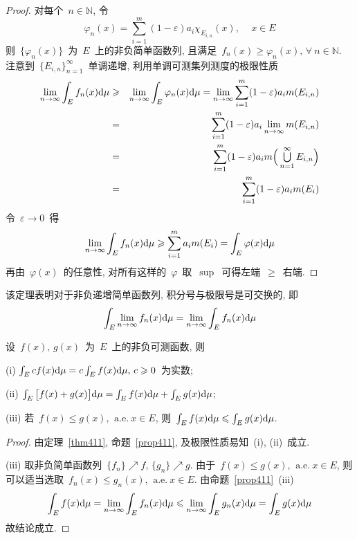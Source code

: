 \begin{proof}
对每个~$n \in \mathbb{N}$, 令
\[
\varphi_n(x) = \sum_{i=1}^m (1- \varepsilon) a_i \chi_{E_{i,n}}(x),\, \quad x \in E
\]
则~$\{\varphi_n(x)\}$~为~$E$~上的非负简单函数列, 且满足~$f_n(x) \geqslant \varphi_n(x),\,  \forall~n \in \mathbb{N}$. 注意到~$\big\{E_{i,n} \big\}_{n=1}^\infty$~单调递增, 利用单调可测集列测度的极限性质
\begin{eqnarray*}
\lim_{n \to \infty} \int_E f_n(x) \mathrm{d} \mu &\geqslant& \lim_{n \to \infty} \int_E \varphi_n(x) \mathrm{d} \mu = \lim_{n \to \infty} \sum_{i=1}^m (1- \varepsilon) a_i m(E_{i,n}) \\
&=& \sum_{i=1}^m (1- \varepsilon) a_i \lim_{n \to \infty} m(E_{i,n}) \\
&=& \sum_{i=1}^m (1- \varepsilon) a_i m\Big( \mathop{\textstyle{\bigcup}}_{n=1}^\infty E_{i,n} \Big) \\
&=& \sum_{i=1}^m (1- \varepsilon) a_i m(E_i)
\end{eqnarray*}
令~$\varepsilon \to 0$~得
\[
\lim\limits_{n \to \infty} \int_E f_n(x) \mathrm{d} \mu \geqslant \sum_{i=1}^m a_i m(E_i) = \int_E \varphi(x) \mathrm{d} \mu
\]
再由~$\varphi(x)$~的任意性, 对所有这样的~$\varphi$~取~$\sup$~可得左端~$\geqslant$~右端.
\end{proof}

\begin{remark} \label{rem411}
该定理表明对于非负递增简单函数列, 积分号与极限号是可交换的, 即
\[
\int_E \lim_{n \to \infty} f_n(x) \mathrm{d} \mu = \lim_{n \to \infty} \int_E f_n(x) \mathrm{d} \mu
\]
\end{remark}

\begin{proposition} \label{prop412}
设~$f(x),\, g(x)$~为~$E$~上的非负可测函数, 则

(i) $\int_E c f(x) \mathrm{d} \mu = c \int_E f(x) \mathrm{d} \mu, \, c \geqslant 0$~为实数;

(ii) $\int_E \big[f(x) + g(x)\big] \mathrm{d} \mu = \int_E f(x) \mathrm{d} \mu + \int_E g(x) \mathrm{d} \mu$;

(iii) 若~$f(x) \leqslant g(x),\,  \mathrm{~a.e.~} x \in E$, 则~$\int_E f(x) \mathrm{d} \mu \leqslant \int_E g(x) \mathrm{d} \mu$.
\end{proposition}

\begin{proof}
由定理~\ref{thm411}, 命题~\ref{prop411}, 及极限性质易知~(i), (ii)~成立.

(iii) 取非负简单函数列~$\{f_n\} \nearrow f,\,  \{g_n\} \nearrow g$. 由于~$f(x) \leqslant g(x),\,  \mathrm{~a.e.~} x \in E$, 则可以适当选取~$f_n(x) \leqslant g_n(x),\,   \mathrm{~a.e.~} x \in E$. 由命题~\ref{prop411}~(iii)
\[
\int_E f(x) \mathrm{d} \mu = \lim_{n \to \infty} \int_E f_n(x) \mathrm{d} \mu \leqslant \lim_{n \to \infty}\int_E g_n(x) \mathrm{d} \mu = \int_E g(x) \mathrm{d} \mu
\]
故结论成立.
\end{proof}

